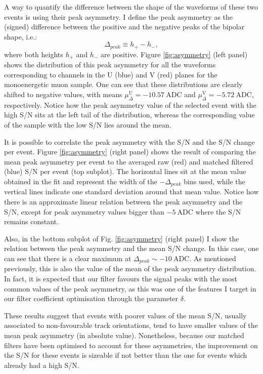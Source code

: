A way to quantify the difference between the shape of the waveforms of these two events is using their peak asymmetry. I define the peak asymmetry as the (signed) difference between the positive and the negative peaks of the bipolar shape, i.e.:
\begin{equation}
\Delta_{peak} \equiv h_{+} - h_{-},
\end{equation}
where both heights $h_{+}$ and $h_{-}$ are positive. Figure \ref{fig:asymmetry} (left panel) shows the distribution of this peak asymmetry for all the waveforms corresponding to channels in the U (blue) and V (red) planes for the monoenergetic muon sample. One can see that these distributions are clearly shifted to negative values, with means $\mu_{\Delta}^{\mathrm{U}} = -10.57 \ \mathrm{ADC}$ and $\mu_{\Delta}^{\mathrm{V}} = -5.72 \ \mathrm{ADC}$, respectively. Notice how the peak asymmetry value of the selected event with the high S/N sits at the left tail of the distribution, whereas the corresponding value of the sample with the low S/N lies around the mean.

It is possible to correlate the peak asymmetry with the S/N and the S/N change per event. Figure \ref{fig:asymmetry} (right panel) shows the result of comparing the mean peak asymmetry per event to the averaged raw (red) and matched filtered (blue) S/N per event (top subplot). The horizontal lines sit at the mean value obtained in the fit and represent the width of the $-\Delta_{peak}$ bins used, while the vertical lines indicate one standard deviation around that mean value. Notice how there is an approximate linear relation between the peak asymmetry and the S/N, except for peak asymmetry values bigger than $- 5 \ \mathrm{ADC}$ where the S/N remains constant.

Also, in the bottom subplot of Fig. \ref{fig:asymmetry} (right panel) I show the relation between the peak asymmetry and the mean S/N change. In this case, one can see that there is a clear maximum at $\Delta_{peak} \sim -10 \ \mathrm{ADC}$. As mentioned previously, this is also the value of the mean of the peak asymmetry distribution. In fact, it is expected that our filter favours the signal peaks with the most common values of the peak asymmetry, as this was one of the features I target in our filter coefficient optimisation through the parameter $\delta$.

These results suggest that events with poorer values of the mean S/N, usually associated to non-favourable track orientations, tend to have smaller values of the mean peak asymmetry (in absolute value). Nonetheless, because our matched filters have been optimised to account for these asymmetries, the improvement on the S/N for these events is sizeable if not better than the one for events which already had a high S/N.

